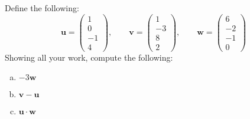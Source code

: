 \documentclass[11pt,letterpaper]{article}
\begin{document}

 Define the following:
	\[
	\mathbf{u}= \begin{pmatrix} 1 \\ 0 \\ -1 \\ 4 \end{pmatrix}, \qquad
	\mathbf{v}= \begin{pmatrix} 1 \\ -3 \\ 8 \\ 2 \end{pmatrix}, \qquad
	\mathbf{w}= \begin{pmatrix} 6 \\ -2 \\ -1 \\ 0 \end{pmatrix}
	\]
Showing all your work, compute the following:
	\begin{enumerate}[(a)]
	\item $-3\mathbf{w}$
	\item $\mathbf{v} - \mathbf{u}$
	\item $\mathbf{u} \cdot \mathbf{w}$
	\end{enumerate} \pspace
\end{document}
